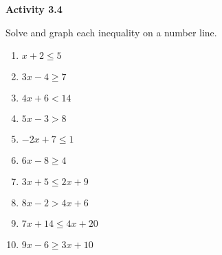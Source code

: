 \vspace{1ex}
\noindent\textbf{Activity 3.4}

\vspace{0.75ex}

Solve and graph each inequality on a number line.
\begin{multicols}{2}
\begin{enumerate}[noitemsep, label = \color{blue}\arabic*. ]    \item $x + 2 \leq 5$
    \item $3x - 4 \geq 7$
    \item $4x + 6 < 14$
    \item $5x - 3 > 8$
    \item $-2x + 7 \leq 1$
    \item $6x - 8 \geq 4$
    \item $3x + 5 \leq 2x + 9$
    \item $8x - 2 > 4x + 6$
    \item $7x + 14 \leq 4x + 20$
    \item $9x - 6 \geq 3x + 10$
\end{enumerate}
\end{multicols}


